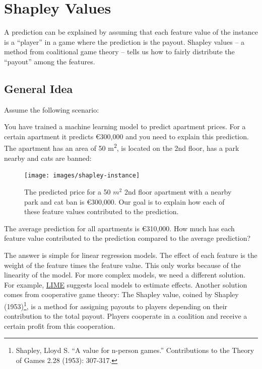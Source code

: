 \documentclass[
  11pt,
]{scrbook}
\begin{document}
\newpage

\hypertarget{shapley}{%
\section{Shapley Values}\label{shapley}}

A prediction can be explained by assuming that each feature value of the instance is a ``player'' in a game where the prediction is the payout.
Shapley values -- a method from coalitional game theory -- tells us how to fairly distribute the ``payout'' among the features.

\hypertarget{general-idea}{%
\subsection{General Idea}\label{general-idea}}

Assume the following scenario:

You have trained a machine learning model to predict apartment prices.
For a certain apartment it predicts €300,000 and you need to explain this prediction.
The apartment has an area of 50 m\textsuperscript{2}, is located on the 2nd floor, has a park nearby and cats are banned:

\begin{figure}

{\centering \texttt{[image: images/shapley-instance]} 

}

\caption{The predicted price for a 50 $m^2$ 2nd floor apartment with a nearby park and cat ban is €300,000. Our goal is to explain how each of these feature values contributed to the prediction.}\label{fig:shapley-instance}
\end{figure}

The average prediction for all apartments is €310,000.
How much has each feature value contributed to the prediction compared to the average prediction?

The answer is simple for linear regression models.
The effect of each feature is the weight of the feature times the feature value.
This only works because of the linearity of the model.
For more complex models, we need a different solution.
For example, \protect\hyperlink{lime}{LIME} suggests local models to estimate effects.
Another solution comes from cooperative game theory:
The Shapley value, coined by Shapley (1953)\footnote{Shapley, Lloyd S. ``A value for n-person games.'' Contributions to the Theory of Games 2.28 (1953): 307-317.}, is a method for assigning payouts to players depending on their contribution to the total payout.
Players cooperate in a coalition and receive a certain profit from this cooperation.
\end{document}
